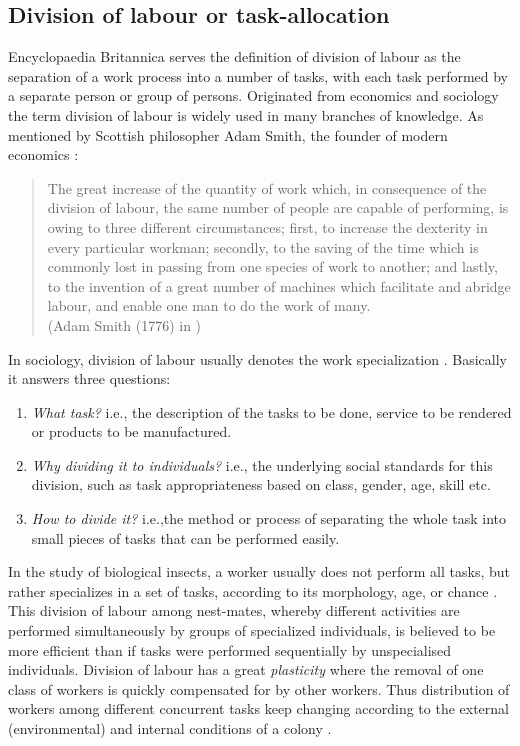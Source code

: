 \subsection{Division of labour or task-allocation}
Encyclopaedia Britannica serves the definition of division of labour as the separation of a work process into a number of tasks, with each task performed by a separate person or group of persons. Originated from economics and sociology the term division of labour is widely used in many branches of knowledge. As mentioned by Scottish philosopher Adam Smith, the founder of modern economics :
\begin{quotation} 
The great increase of the quantity of work which, in consequence of the division of labour, the same number of people are capable of performing, is owing to three different circumstances; first, to increase the dexterity in every particular workman; secondly, to the saving of the time which is commonly lost in passing from one species of work to another; and lastly, to the invention of a great number of machines which facilitate and abridge labour, and enable one man to do the work of many.\\
(Adam Smith (1776) in \cite{Sendova-Franks+1999})
\end{quotation} 
In sociology, division of labour usually denotes the work specialization \cite{Sayer+1992}. Basically it answers three questions:
\begin{enumerate}
\item {\em What task?} i.e., the description of the tasks to be done, service to be rendered or products to be manufactured.
\item  {\em Why dividing it to individuals?} i.e., the underlying social standards for this division, such as task appropriateness based on class, gender, age, skill etc.
\item {\em How to divide it?} i.e.,the method or process of separating the whole task into small pieces of tasks that can be performed easily. 
\end{enumerate}
In the study of biological insects, a worker usually does not perform all tasks, but rather specializes in a set of tasks, according to its morphology, age, or chance \cite{Bonabeau+1999}. This division of labour among nest-mates, whereby different activities are performed simultaneously by groups of specialized individuals, is believed to be more efficient than if tasks were performed sequentially by unspecialised individuals. Division of labour has a great {\em plasticity} where the removal of one class of workers is quickly compensated for by other workers. Thus distribution of workers among different concurrent tasks keep changing according to the external (environmental) and internal conditions of a colony \cite{Garnier+2007}.


